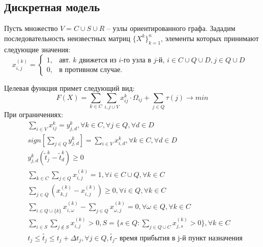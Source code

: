 \documentclass[]{TAACpaper}
\begin{document}
\subsection{Дискретная модель}
Пусть множество $V=C\cup{S}\cup{R}$ -- узлы ориентированного графа. Зададим последовательность неизвестных матриц $\{X^k\}^n_{k=1}$, элементы  которых принимают следующие значения:
\begin{equation}
  x^{(k)}_{i,j} = 
    \begin{cases}
	  1,&\text{авт. $k$ движется из $i$-го узла в $j$-й, 
	           $i\in{C}\cup{Q}\cup{D}, j \in Q\cup{D}$ }\\
	  0,&\text{в противном случае.}
    \end{cases}
\end{equation}




Целевая функция примет следующий вид:
\begin{equation} \label{main_objective}
  F(X) = 
    \sum_{k \in C}
     \sum_{i,j\cup{V}} 
     x_{ij}^{k}\cdot\Omega_{ij}+\sum_{j\in{Q}}\tau(j)
     \to min
\end{equation}
При ограничениях:
\begin{align} 
& \sum_{i\in{V}}x_{ij}^{k}=y_{j,d}^{k}, \forall{k}\in{C}, \forall{j}\in{Q},\forall{d}\in{D}\\
& sign[\sum_{j\in{Q}}y_{j,d}^{k}]=\sum_{i\in{V}}x_{i,d}^{k}, \forall{k}\in{C}, \forall{d}\in{D}\\
& y_{j,d}^{k}(\tilde{t}_{j}^{k}-\tilde{t}_{d}^{k})\ge{0}\\
& \sum_{k \in C}\sum_{j \in Q}x^{(k)}_{i,j} = 1, 
  \forall i \in C \cup Q, \forall k \in C \label{main_cond_1}\\ 
& \sum_{j \in Q} ( 
       x^{(k)}_{k,j} -x^{(k)}_{i,j} ) \geq 0, 
       \forall i \in Q ,  \forall k \in C \label{main_cond_2}\\
& \sum_{i \in Q \cup  \{k\}} x^{(k)}_{i,\omega} - 
  \sum_{j \in Q} x^{(k)}_{\omega,j} = 0, 
  \forall \omega \in Q ,  \forall k \in C \label{main_cond_3}\\
&  \sum_{i \in S}\sum_{j \notin S}x^{(k)}_{i,j} > 0, 
  S=\{s \in Q: \sum_{j \in Q \cup C}x^{(k)}_{j,s}>0 \}  ,\forall k \in C \label{main_cond_4}\\
& t_j \leq \tilde{t_j} \leq t_j + \Delta t_j, \forall j \in Q, 
\tilde{t_j} \text {- время прибытия в j-й пункт назначения} \label{main_cond_5}
\end{align}
\end{document}
